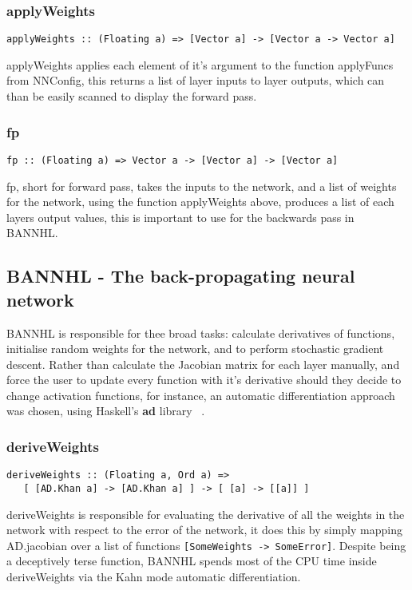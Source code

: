 \documentclass[a4paper]{article}
\begin{document}
\subsubsection{applyWeights}
\begin{verbatim}
applyWeights :: (Floating a) => [Vector a] -> [Vector a -> Vector a]
\end{verbatim}
applyWeights applies each element of it's argument to the function
applyFuncs from NNConfig, this returns a list of layer inputs to
layer outputs, which can than be easily scanned to display the forward pass.

\subsubsection{fp}
\begin{verbatim}
fp :: (Floating a) => Vector a -> [Vector a] -> [Vector a]
\end{verbatim}
fp, short for forward pass, takes the inputs to the network, and a list
of weights for the network, using the function applyWeights above, produces
a list of each layers output values, this is important to use for the backwards
pass in BANNHL.

\subsection{BANNHL - The back-propagating neural network}
BANNHL is responsible for thee broad tasks: calculate derivatives of functions,
initialise random weights for the network, and to perform stochastic gradient
descent. Rather than calculate the Jacobian matrix for each layer manually,
and force the user to update every function with it's derivative should they
decide to change activation functions, for instance, an automatic
differentiation approach was chosen, using Haskell's \textbf{ad} library 
~\cite{Elliott2009-beautiful-differentiation}.

\subsubsection{deriveWeights}
\begin{verbatim}
deriveWeights :: (Floating a, Ord a) => 
   [ [AD.Khan a] -> [AD.Khan a] ] -> [ [a] -> [[a]] ]
\end{verbatim}
deriveWeights is responsible for evaluating the derivative of all the weights
in the network with respect to the error of the network, it does this by
simply mapping AD.jacobian over a list of functions
\texttt{[SomeWeights -> SomeError]}. 
Despite being a deceptively terse function, BANNHL spends most of the CPU
time inside deriveWeights via the Kahn mode automatic differentiation.
\end{document}
